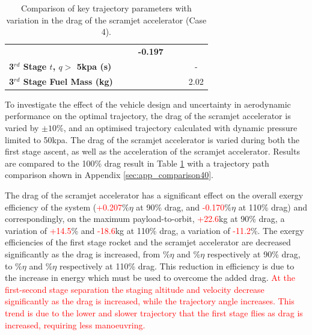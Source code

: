 \begin{table}[ht!]
\begin{tabular}{l c c c c c c}
		& \textbf{\thirddExergyEffCdOneHundredFiveNoReturn}
		& \textbf{\thirddExergyEffCdOneHundredTenNoReturn}
		& \textbf{-0.197}
		\\
		\textbf{3$^{rd}$ Stage $t$, $q >$ 5kpa (s)}
		& \thirdqOverFiveCdNinetyNoReturn
		& \thirdqOverFiveCdNinetyFiveNoReturn
		& \thirdqOverFiveCdStandardNoReturn
		& \thirdqOverFiveCdOneHundredFiveNoReturn
		& \thirdqOverFiveCdOneHundredTenNoReturn
		& -
		\\
		\textbf{3$^{rd}$ Stage Fuel Mass (kg)}
		& \thirdmFuelCdNinetyNoReturn
		& \thirdmFuelCdNinetyFiveNoReturn
		& \thirdmFuelCdStandardNoReturn
		& \thirdmFuelCdOneHundredFiveNoReturn
		& \thirdmFuelCdOneHundredTenNoReturn
		&2.02
		\\
		\hline 
	\end{tabular} 
	\caption{Comparison of key trajectory parameters with variation in the drag of the scramjet accelerator (Case 4).}
	\label{tab:DragVariationNoReturn}
\end{table}

To investigate the effect of the vehicle design and uncertainty in aerodynamic performance on the optimal trajectory, the drag of the scramjet accelerator is varied by $\pm10$\%, and an optimised trajectory calculated with dynamic pressure limited to 50kpa. The drag of the scramjet accelerator is varied during both the first stage ascent, as well as the acceleration of the scramjet accelerator. Results are compared to the 100\% drag result in Table \ref{tab:DragVariationNoReturn} with a trajectory path comparison shown in Appendix \ref{sec:app_comparison40}. 

The drag of the scramjet accelerator has a significant effect on the overall exergy efficiency of the system (\textcolor{red}{+0.207}\%$\eta$ at 90\% drag, and \textcolor{red}{-0.170}\%$\eta$ at 110\% drag) and correspondingly, on the maximum payload-to-orbit, \textcolor{red}{+22.6}kg at 90\% drag, a variation of \textcolor{red}{+14.5}\% and \textcolor{red}{-18.6}kg at 110\% drag, a variation of \textcolor{red}{-11.2}\%. The exergy efficiencies of the first stage rocket and the scramjet accelerator are decreased significantly as the drag is increased, from \firstExergyEffCdNinetyNoReturn\%$\eta$ and \secondExergyEffCdNinetyNoReturn\%$\eta$ respectively at 90\% drag, to \firstExergyEffCdOneHundredTenNoReturn\%$\eta$ and \secondExergyEffCdOneHundredTenNoReturn\%$\eta$ respectively at 110\% drag. This reduction in efficiency is due to the increase in energy which must be used to overcome the added drag. 
\textcolor{red}{
At the first-second stage separation the staging altitude and velocity decrease significantly as the drag is increased, while the trajectory angle increases. This trend is due to the lower and slower trajectory that the first stage flies as drag is increased, requiring less manoeuvring. }


